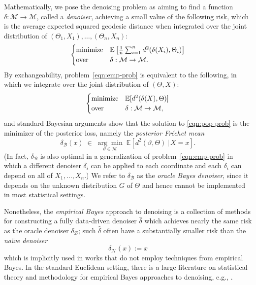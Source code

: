 \documentclass[preprint]{imsart}
\theoremstyle{plain}
\theoremstyle{definition}
\newcommand{\Ebb}{\mathbb{E}}
\newcommand{\Mcal}{\mathcal{M}}
\newcommand{\B}{\mathcal{B}}
\newcommand{\N}{\mathcal{N}}
\begin{document}
Mathematically, we pose the denoising problem as aiming to find a function $\delta:\Mcal\to\Mcal$, called a \textit{denoiser}, achieving a small value of the following risk, which is the average expected squared geodesic distance when integrated over the joint distribution of $(\Theta_1,X_1),\ldots, (\Theta_n,X_n)$:
\begin{equation}\label{eqn:emp-prob}
		\begin{cases}
			\textnormal{minimize} &\Ebb\left[\frac{1}{n}\sum_{i=1}^{n}d^2(\delta(X_i),\Theta_i)\right] \\
            \textnormal{over} &\delta:\Mcal\to\Mcal.
		\end{cases}
	\end{equation}
    By exchangeability, problem~\eqref{eqn:emp-prob} is equivalent to the following, in which we integrate over the joint distribution of $(\Theta,X)$:
	\begin{equation}\label{eqn:pop-prob}
		\begin{cases}
			\textnormal{minimize} &\Ebb[d^2(\delta(X),\Theta)] \\
			\textnormal{over} &\delta:\Mcal\to\Mcal,
		\end{cases}
	\end{equation}
    and standard Bayesian arguments show that the solution to \eqref{eqn:pop-prob} is the minimizer of the posterior loss, namely the \textit{posterior Fr\'echet mean}
    \begin{equation}\label{eqn:pop-FM}
        \delta_{\B}(x) \; \in \;\underset{\vartheta\in\Mcal}{\arg\min}\;\Ebb[d^2(\vartheta,\Theta)\,|\,X=x].
    \end{equation}
    (In fact, $\delta_{\B}$ is also optimal in a generalization of problem~\eqref{eqn:emp-prob} in which a different denoiser $\delta_i$ can be applied to each coordinate and each $\delta_i$ can depend on all of $X_1,\ldots, X_n$.)    
    We refer to $\delta_{\B}$ as the \textit{oracle Bayes denoiser}, since it depends on the unknown distribution $G$ of $\Theta$ and hence cannot be implemented in most statistical settings.
    
    Nonetheless, the \textit{empirical Bayes} approach to denoising is a collection of methods for constructing a fully data-driven denoiser $\hat{\delta}$ which achieves nearly the same risk as the oracle denoiser $\delta_{\B}$; such $\hat{\delta}$ often have a substantially smaller risk than the \textit{na\"ive denoiser}
    \begin{equation}
        \delta_{\N}(x):=x
    \end{equation}
    which is implicitly used in works that do not employ techniques from empirical Bayes.
    In the standard Euclidean setting, there is a large literature on statistical theory and methodology for empirical Bayes approaches to denoising, e.g., \cite{Zhang1997, JiangZhang, SahaGuntuboyina, Soloff, Robbins1951, Robbins1956, efron2011tweedie, Efron2014, efron2019bayes}.
\end{document}

